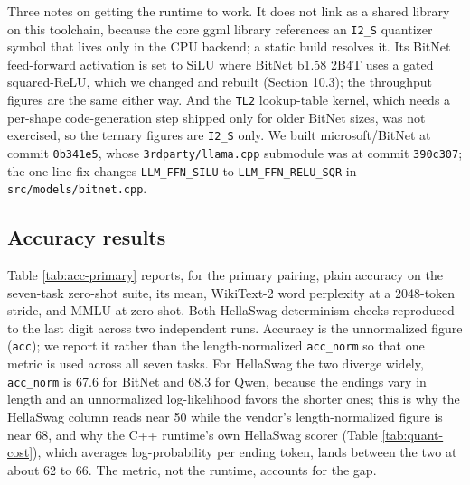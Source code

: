 \documentclass[11pt]{article}
\begin{document}
Three notes on getting the runtime to work. It does not link as a shared library on this
toolchain, because the core ggml library references an \texttt{I2\_S} quantizer symbol that lives
only in the CPU backend; a static build resolves it. Its BitNet feed-forward activation
is set to SiLU where BitNet b1.58 2B4T uses a gated squared-ReLU, which we changed and
rebuilt (Section 10.3); the throughput figures are the same either way. And the \texttt{TL2}
lookup-table kernel, which needs a per-shape code-generation step shipped only for older
BitNet sizes, was not exercised, so the ternary figures are \texttt{I2\_S} only. We built
microsoft/BitNet at commit \texttt{0b341e5}, whose \texttt{3rdparty/llama.cpp} submodule was at
commit \texttt{390c307}; the one-line fix changes \texttt{LLM\_FFN\_SILU} to \texttt{LLM\_FFN\_RELU\_SQR} in
\texttt{src/models/bitnet.cpp}.

\subsection{Accuracy results}

Table \ref{tab:acc-primary} reports, for the primary pairing, plain accuracy on the
seven-task zero-shot suite, its mean, WikiText-2 word perplexity at a 2048-token stride,
and MMLU at zero shot. Both HellaSwag determinism checks reproduced to the last digit across two
independent runs. Accuracy is the unnormalized figure (\texttt{acc}); we report it rather than
the length-normalized \texttt{acc\_norm} so that one metric is used across all seven tasks. For
HellaSwag the two diverge widely, \texttt{acc\_norm} is 67.6 for BitNet and 68.3 for Qwen,
because the endings vary in length and an unnormalized log-likelihood favors the shorter
ones; this is why the HellaSwag column reads near 50 while the vendor's length-normalized
figure is near 68, and why the C++ runtime's own HellaSwag scorer (Table \ref{tab:quant-cost}),
which averages log-probability per ending token, lands between the two at about
62 to 66. The metric, not the runtime, accounts for the gap.
\end{document}
